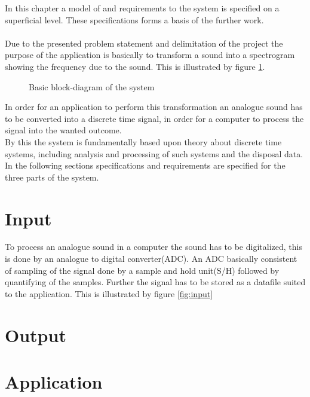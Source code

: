 In this chapter a model of and requirements to the system is specified on a superficial level. These specifications forms a basis of the further work. 
\\ \\
Due to the presented problem statement and delimitation of the project the purpose of the application is basically to transform a sound into a spectrogram showing the frequency due to the sound. This is illustrated by figure \ref{fig:model1}.    
\begin{figure}[h]
\centering
{}
\caption{Basic block-diagram of the system}
\label{fig:model1}
\end{figure}
In order for an application to perform this transformation an analogue sound has to be converted into a discrete time signal, in order for a computer to process the signal into the wanted outcome. \\
By this the system is fundamentally based upon theory about discrete time systems, including analysis and processing of such systems and the disposal data. \\
In the following sections specifications and requirements are specified for the three parts of the system.  

\section{Input}
To process an analogue sound in a computer the sound has to be digitalized, this is done by an analogue to digital converter(ADC). An ADC basically consistent of sampling of the signal done by a sample and hold unit(S/H) followed by quantifying of the samples. Further the signal has to be stored as a datafile suited to the application. This is illustrated by figure \ref{fig:input} 

% 
        

\section{Output}

\section{Application}
